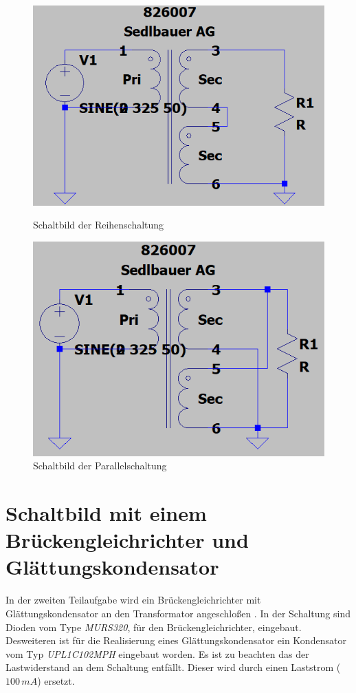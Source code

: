        \begin{figure}[ht!]
            \begin{minipage}[c]{0.5\textwidth}
                \includegraphics[width=.9\linewidth]{Bilder/transformator_reihe.PNG}
                \caption{Schaltbild der Reihenschaltung}
                \label{fig:reihenschaltung}
            \end{minipage}
            \begin{minipage}[c]{0.5\textwidth}
                \includegraphics[width=.9\linewidth]{Bilder/transformator_parallel.png}
                \caption{Schaltbild der Parallelschaltung}
                \label{fig:parallelschaltung}
            \end{minipage}
        \end{figure}
    \newpage
    \section{Schaltbild mit einem Brückengleichrichter und Glättungskondensator}
        In der zweiten Teilaufgabe wird ein Brückengleichrichter mit Glättungskondensator an den Transformator angeschloßen .
        In der Schaltung sind Dioden vom Type \textit{MURS320}, für den Brückengleichrichter, eingebaut. Desweiteren ist für die Realisierung eines Glättungskondensator ein Kondensator vom Typ \textit{UPL1C102MPH} eingebaut worden. Es ist zu beachten das der Lastwiderstand an dem Schaltung entfällt. Dieser wird durch einen Laststrom ($100 \, mA$) ersetzt.


